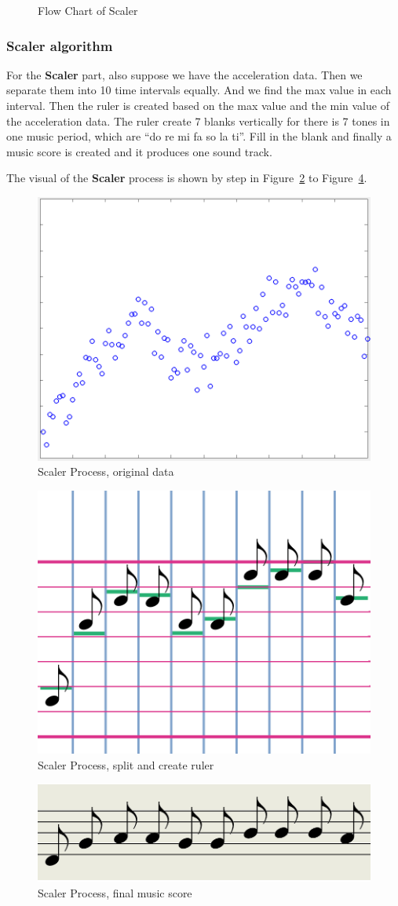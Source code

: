 \begin{figure}[H]
\begin{minipage}[b]{0.5\linewidth}
\caption{Flow Chart of Scaler}
\label{FlowMatcher}
\vspace{4ex}
\end{minipage}%
\end{figure}

\subsubsection{Scaler algorithm}

For the \textbf{Scaler} part, also suppose we have the acceleration data. Then
we separate them into 10 time intervals equally. And we find the max value in
each interval. Then the ruler is created based on the max value and the min
value of the acceleration data. The ruler create 7 blanks vertically for there
is 7 tones in one music period, which are ``do re mi fa so la ti''. Fill in the
blank and finally a music score is created and it produces one sound track. 

The visual of the \textbf{Scaler} process is shown by step in
Figure~\ref{scalerStep0} to Figure~\ref{scalerStep2}. 

\begin{figure}[H]
\centering
\includegraphics[width=0.35\linewidth]{figWR/scaler0}
\caption{Scaler Process, original data}
\label{scalerStep0}
\end{figure}


\begin{figure}[H]
\centering
\includegraphics[width=0.35\linewidth]{figWR/scaler1}
\caption{Scaler Process, split and create ruler}
\label{scalerStep1}
\end{figure}


\begin{figure}[H]
\centering
\newcommand{\widthOfScalerStepFigure}{5cm}
\includegraphics[width=0.35\linewidth]{figWR/scaler2}
\caption{Scaler Process, final music score}
\label{scalerStep2}
\end{figure}


